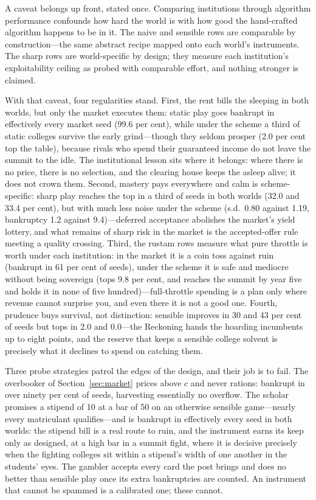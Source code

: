 \documentclass[11pt,a4paper]{article}
\begin{document}
A caveat belongs up front, stated once. Comparing institutions through algorithm performance confounds how hard the world is with how good the hand-crafted algorithm happens to be in it. The naive and sensible rows are comparable by construction---the same abstract recipe mapped onto each world's instruments. The sharp rows are world-specific by design; they measure each institution's exploitability ceiling as probed with comparable effort, and nothing stronger is claimed.

With that caveat, four regularities stand. First, the rent bills the sleeping in both worlds, but only the market executes them: static play goes bankrupt in effectively every market seed (99.6 per cent), while under the scheme a third of static colleges survive the early grind---though they seldom prosper (2.0 per cent top the table), because rivals who spend their guaranteed income do not leave the summit to the idle. The institutional lesson sits where it belongs: where there is no price, there is no selection, and the clearing house keeps the asleep alive; it does not crown them. Second, mastery pays everywhere and calm is scheme-specific: sharp play reaches the top in a third of seeds in both worlds (32.0 and 33.4 per cent), but with much less noise under the scheme (s.d.\ 0.80 against 1.19, bankruptcy 1.2 against 9.4)---deferred acceptance abolishes the market's yield lottery, and what remains of sharp risk in the market is the accepted-offer rule meeting a quality crossing. Third, the rustam rows measure what pure throttle is worth under each institution: in the market it is a coin toss against ruin (bankrupt in 61 per cent of seeds), under the scheme it is safe and mediocre without being sovereign (tops 9.8 per cent, and reaches the summit by year five and holds it in none of five hundred)---full-throttle spending is a plan only where revenue cannot surprise you, and even there it is not a good one. Fourth, prudence buys survival, not distinction: sensible improves in 30 and 43 per cent of seeds but tops in 2.0 and 0.0---the Reckoning hands the hoarding incumbents up to eight points, and the reserve that keeps a sensible college solvent is precisely what it declines to spend on catching them.

Three probe strategies patrol the edges of the design, and their job is to fail. The overbooker of Section~\ref{sec:market} prices above $c$ and never rations: bankrupt in over ninety per cent of seeds, harvesting essentially no overflow. The scholar promises a stipend of 10 at a bar of 50 on an otherwise sensible game---nearly every matriculant qualifies---and is bankrupt in effectively every seed in both worlds: the stipend bill is a real route to ruin, and the instrument earns its keep only as designed, at a high bar in a summit fight, where it is decisive precisely when the fighting colleges sit within a stipend's width of one another in the students' eyes. The gambler accepts every card the post brings and does no better than sensible play once its extra bankruptcies are counted. An instrument that cannot be spammed is a calibrated one; these cannot.
\end{document}
